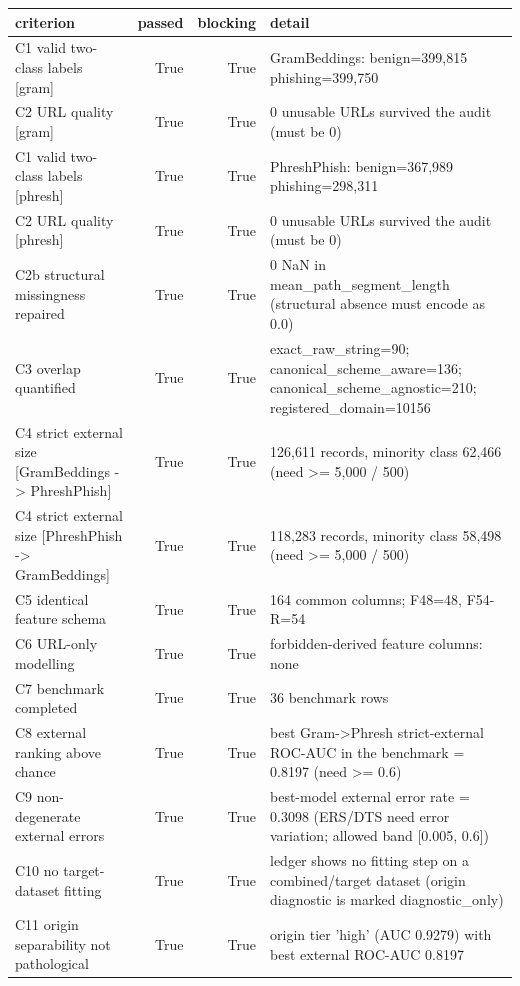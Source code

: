 \begin{tabular}{lrrl}
\toprule
criterion & passed & blocking & detail \\
\midrule
C1 valid two-class labels [gram] & True & True & GramBeddings: benign=399,815 phishing=399,750 \\
C2 URL quality [gram] & True & True & 0 unusable URLs survived the audit (must be 0) \\
C1 valid two-class labels [phresh] & True & True & PhreshPhish: benign=367,989 phishing=298,311 \\
C2 URL quality [phresh] & True & True & 0 unusable URLs survived the audit (must be 0) \\
C2b structural missingness repaired & True & True & 0 NaN in mean\_path\_segment\_length (structural absence must encode as 0.0) \\
C3 overlap quantified & True & True & exact\_raw\_string=90; canonical\_scheme\_aware=136; canonical\_scheme\_agnostic=210; registered\_domain=10156 \\
C4 strict external size [GramBeddings -> PhreshPhish] & True & True & 126,611 records, minority class 62,466 (need >= 5,000 / 500) \\
C4 strict external size [PhreshPhish -> GramBeddings] & True & True & 118,283 records, minority class 58,498 (need >= 5,000 / 500) \\
C5 identical feature schema & True & True & 164 common columns; F48=48, F54-R=54 \\
C6 URL-only modelling & True & True & forbidden-derived feature columns: none \\
C7 benchmark completed & True & True & 36 benchmark rows \\
C8 external ranking above chance & True & True & best Gram->Phresh strict-external ROC-AUC in the benchmark = 0.8197 (need >= 0.6) \\
C9 non-degenerate external errors & True & True & best-model external error rate = 0.3098 (ERS/DTS need error variation; allowed band [0.005, 0.6]) \\
C10 no target-dataset fitting & True & True & ledger shows no fitting step on a combined/target dataset (origin diagnostic is marked diagnostic\_only) \\
C11 origin separability not pathological & True & True & origin tier 'high' (AUC 0.9279) with best external ROC-AUC 0.8197 \\
\bottomrule
\end{tabular}
